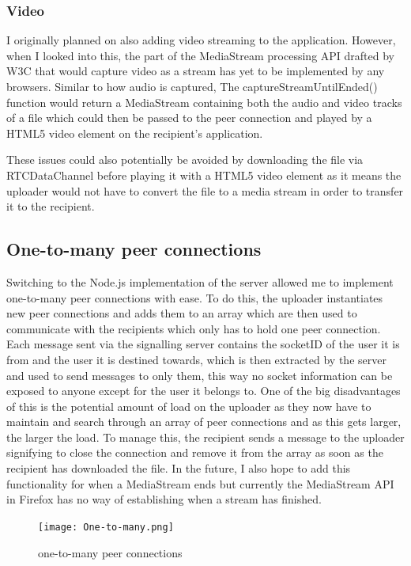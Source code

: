 \documentclass[]{report}
\begin{document}
				\subsubsection{Video}
				I originally planned on also adding video streaming to the application. However, when I looked into this, the part of the MediaStream processing API drafted by W3C that would capture video as a stream has yet to be implemented by any browsers. Similar to how audio is captured, The captureStreamUntilEnded() function would return a MediaStream containing both the audio and video tracks of a file which could then be passed to the peer connection and played by a HTML5 video element on the recipient's application.
				
				These issues could also potentially be avoided by downloading the file via RTCDataChannel before playing it with a HTML5 video element as it means the uploader would not have to convert the file to a media stream in order to transfer it to the recipient.
			
			\subsection{One-to-many peer connections}
			Switching to the Node.js implementation of the server allowed me to implement one-to-many peer connections with ease. To do this, the uploader instantiates new peer connections and adds them to an array which are then used to communicate with the recipients which only has to hold one peer connection. Each message sent via the signalling server contains the socketID of the user it is from and the user it is destined towards, which is then extracted by the server and used to send messages to only them, this way no socket information can be exposed to anyone except for the user it belongs to. One of the big disadvantages of this is the potential amount of load on the uploader as they now have to maintain and search through an array of peer connections and as this gets larger, the larger the load. To manage this, the recipient sends a message to the uploader signifying to close the connection and remove it from the array as soon as the recipient has downloaded the file. In the future, I also hope to add this functionality for when a MediaStream ends but currently the MediaStream API in Firefox has no way of establishing when a stream has finished.
			 
			\begin{figure}[H]
				\caption{one-to-many peer connections}
				\centering
				\texttt{[image: One-to-many.png]}
			\end{figure}	
						
\end{document}
